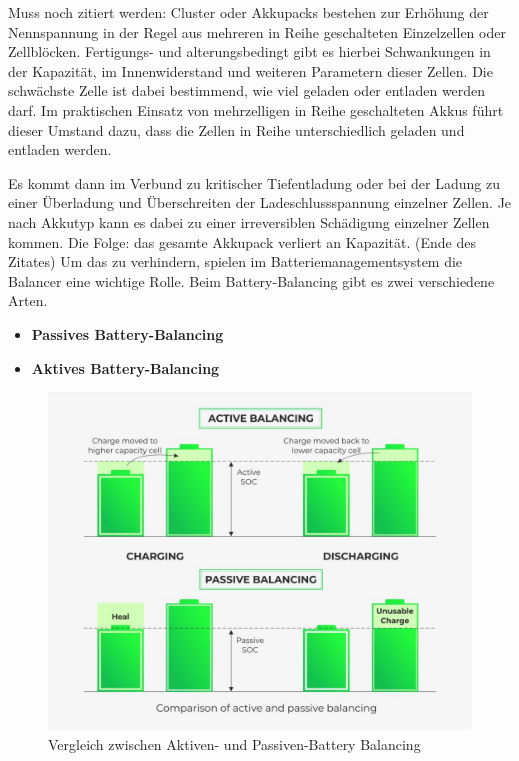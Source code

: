 Muss noch zitiert werden: Cluster oder Akkupacks bestehen zur Erhöhung der Nennspannung in der Regel aus mehreren in Reihe geschalteten Einzelzellen oder Zellblöcken. Fertigungs- und alterungsbedingt gibt es hierbei Schwankungen in der Kapazität, im Innenwiderstand und weiteren Parametern dieser Zellen. Die schwächste Zelle ist dabei bestimmend, wie viel geladen oder entladen werden darf. Im praktischen Einsatz von mehrzelligen in Reihe geschalteten Akkus führt dieser Umstand dazu, dass die Zellen in Reihe unterschiedlich geladen und entladen werden.

Es kommt dann im Verbund zu kritischer Tiefentladung oder bei der Ladung zu einer Überladung und Überschreiten der Ladeschlussspannung einzelner Zellen. Je nach Akkutyp kann es dabei zu einer irreversiblen Schädigung einzelner Zellen kommen. Die Folge: das gesamte Akkupack verliert an Kapazität. (Ende des Zitates)
Um das zu verhindern, spielen im Batteriemanagementsystem die Balancer eine wichtige Rolle. Beim Battery-Balancing gibt es zwei verschiedene Arten. 
\begin{itemize}
\item \textbf{Passives Battery-Balancing}
\item \textbf{Aktives Battery-Balancing} \medskip\\
\end{itemize}

\begin{figure}[H]
	\begin{center}
		\includegraphics[scale=1.5]{figures/Akku/Vergleichaktivespassives.jpg}
		\caption{Vergleich zwischen Aktiven- und Passiven-Battery Balancing\cite{VergleichBalancing}}
		\label{fig: Vergleich zwischen Aktiven- und Passiven-Battery Balancing}
	\end{center}
\end{figure}
\newpage

